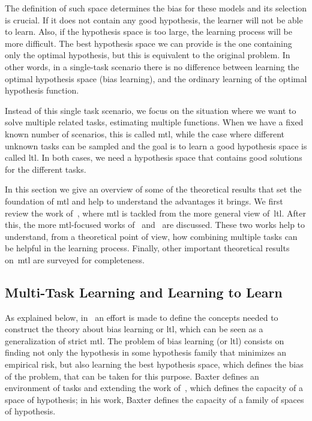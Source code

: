 The definition of such space determines the bias for these models and its selection is crucial. If it does not contain any good hypothesis, the learner will not be able to learn.
Also, if the hypothesis space is too large, the learning process will be more difficult.
The best hypothesis space we can provide is the one containing only the optimal hypothesis, but this is equivalent to the original problem. In other words, in a single-task scenario there is no difference between learning the optimal hypothesis space (bias learning),
and the ordinary learning of the optimal hypothesis function.

Instead of this single task scenario, we focus on the situation where we want to solve multiple related tasks, estimating multiple functions. When we have a fixed known number of scenarios, this is called \acrshort{mtl}, while the case where different unknown tasks can be sampled and the goal is to learn a good hypothesis space is called \acrshort{ltl}. In both cases, we need a hypothesis space that contains good solutions for the different tasks.

In this section we give an overview of some of the theoretical results that set the foundation of \acrshort{mtl} and help to understand the advantages it brings. We first review the work of~\citet{baxter2000model}, where \acrshort{mtl} is tackled from the more general view of~\acrshort{ltl}. After this, the more \acrshort{mtl}-focused works of~\citet{Ben-DavidB08} and~\citet{Ben-DavidS03} are discussed.
%
These two works help to understand, from a theoretical point of view, how combining multiple tasks can be helpful in the learning process.
%
Finally, other important theoretical results on~\acrshort{mtl} are surveyed for completeness.
\subsection{Multi-Task Learning and Learning to Learn} %
%
As explained below, in~\cite{baxter2000model} an effort is made to define the concepts needed to construct the theory about bias learning or \acrshort{ltl}, which can be seen as a generalization of strict \acrshort{mtl}. 
The problem of bias learning (or \acrshort{ltl}) consists on finding not only the hypothesis in some hypothesis family that minimizes an empirical risk, but also learning the best hypothesis space, which defines the bias of the problem, that can be taken for this purpose.
Baxter defines an environment of tasks and extending the work of~\cite{Vapnik00}, which defines the capacity of a space of hypothesis; in his work, Baxter defines the capacity of a family of spaces of hypothesis.

